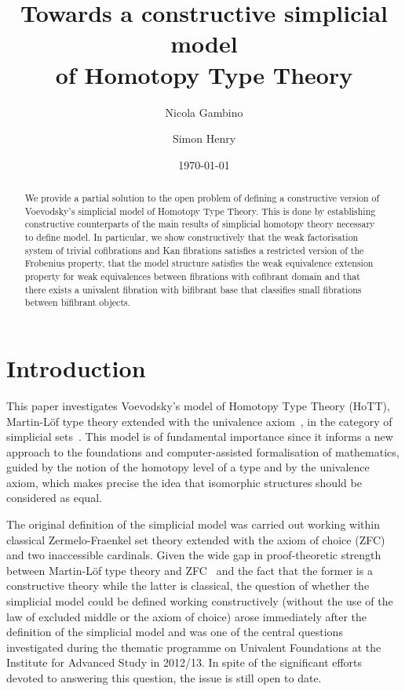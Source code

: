 \documentclass[reqno,10pt,a4paper,oneside,draft]{amsart}
\title[]{Towards a constructive  simplicial model \\ of Homotopy Type Theory}
\begin{document}
\begin{abstract}
We provide a partial solution to the open problem of defining a constructive version of 
Voevodsky's simplicial model of Homotopy Type Theory. This is done by establishing
constructive counterparts of the main results of simplicial homotopy theory
necessary to define model. In particular, 
 we show constructively that the weak factorisation system of trivial cofibrations and Kan fibrations satisfies a
restricted version of the Frobenius property, that the model structure satisfies the weak equivalence extension property
for weak equivalences between fibrations with cofibrant domain and that there exists a univalent 
 fibration with bifibrant base that classifies small fibrations between bifibrant objects.
\end{abstract}

\author{Nicola Gambino}
\address{School of Mathematics, University of Leeds, Leeds LS2 9JT, United Kingdom}


\author{Simon Henry}
\address{Department of Mathematics and Statistics, Masaryk University, Brno, Czeck Republic}


 \date{\today}
 
 

\maketitle



\section*{Introduction} 

This paper investigates Voevodsky's model of Homotopy  Type Theory (HoTT), \ie Martin-L\"of type theory extended with the univalence axiom~\cite{hottbook}, in the category of simplicial sets~\cite{voevodsky-simplicial-model}. This model is of fundamental importance since it informs a new approach to the foundations
and computer-assisted formalisation of mathematics, guided by the notion of the homotopy level of a type and by the univalence axiom, which makes precise the idea that isomorphic structures should be considered as equal. 

The original definition of the simplicial model  was carried out working within classical Zermelo-Fraenkel set theory extended with the axiom of choice (ZFC) and two inaccessible cardinals. Given the wide gap in proof-theoretic strength between Martin-L\"of type theory and ZFC~\cite{GrifforE:strsml} and the fact that the former is a constructive theory while the latter is classical,
 the question of whether the simplicial model could be defined working constructively (\ie without the use of the law of excluded middle or the axiom of choice) arose immediately after the definition of the simplicial
 model and was one of the
 central questions investigated during the thematic programme on Univalent Foundations at the Institute for Advanced Study in 2012/13. In spite of the significant efforts devoted to answering this question,
the issue is still open to date.
\end{document}
